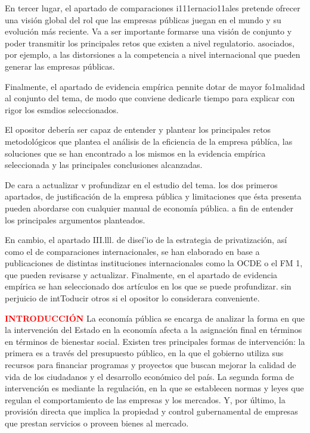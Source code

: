 \documentclass[10pt,a4paper]{article}
\begin{document}
En tercer lugar, el apartado de comparaciones i111ernacio11ales pretende ofrecer una visión global del rol que las empresas públicas juegan en el mundo y su evolución más reciente. Va a ser importante formarse una visión de conjunto y poder transmitir los principales retos que existen a nivel regulatorio. asociados, por ejemplo, a las distorsiones a la competencia a nivel internacional que pueden generar las empresas públicas.

Finalmente, el apartado de evidencia empírica pennite dotar de mayor fo1malidad al conjunto del tema, de modo que conviene dedicarle tiempo para explicar con rigor los esmdios seleccionados.

El opositor debería ser capaz de entender y plantear los principales retos metodológicos que plantea el análisis de la eficiencia de la empresa públíca, las soluciones que se han encontrado a los mismos en la evidencia empírica seleccionada y las principales conclusiones alcanzadas.

De cara a actualizar v profundizar en el estudio del tema. los dos primeros apartados, de justificación de la empresa pública y limitaciones que ésta presenta pueden abordarse con cualquier manual de economía pública. a fin de entender los principales argumentos planteados.

En cambio, el apartado III.lll. de diseí'io de la estrategia de privatización, así como el de comparaciones internacionales, se han elaborado en base a publicaciones de distintas instituciones internacionales como la OCDE o el FM 1, que pueden revisarse y actualizar. Finalmente, en el apartado de evidencia empírica se han seleccionado dos artículos en los que se puede profundizar. sin perjuicio de intToducir otros si el opositor lo considerara conveniente.

\textcolor{red}{\textbf{INTRODUCCIÓN}}
La economía pública se encarga de analizar la forma en que la intervención del Estado en la economía afecta a la asignación final en términos en términos de bienestar social. Existen tres principales formas de intervención: la primera es a través del presupuesto público, en la que el gobierno utiliza sus recursos para financiar programas y proyectos que buscan mejorar la calidad de vida de los ciudadanos y el desarrollo económico del país. La segunda forma de intervención es mediante la regulación, en la que se establecen normas y leyes que regulan el comportamiento de las empresas y los mercados. Y, por último, la provisión directa que implica la propiedad y control gubernamental de empresas que prestan servicios o proveen bienes al mercado.
\end{document}
